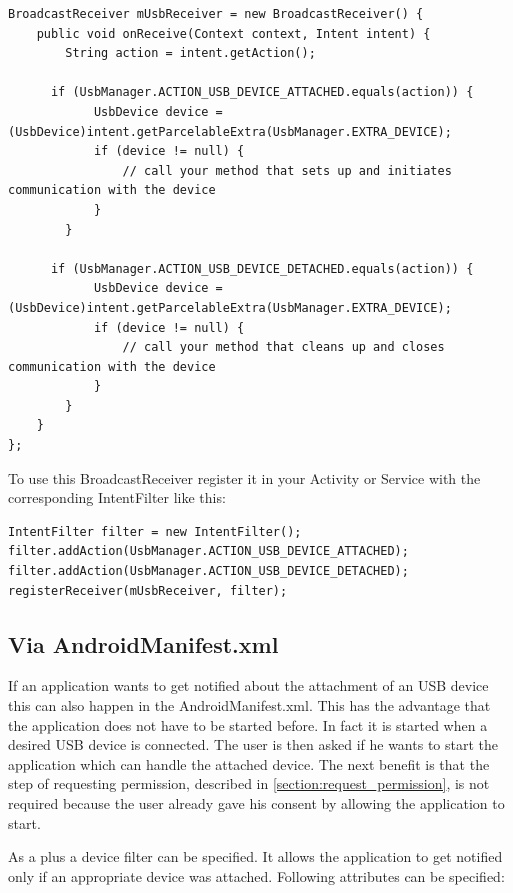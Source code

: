 \begin{lstlisting}[caption=Attach and detach notification of USB devices via BroadcastReceivers, label=listing:attach_broadcast]
BroadcastReceiver mUsbReceiver = new BroadcastReceiver() {
    public void onReceive(Context context, Intent intent) {
        String action = intent.getAction(); 

      if (UsbManager.ACTION_USB_DEVICE_ATTACHED.equals(action)) {
            UsbDevice device = (UsbDevice)intent.getParcelableExtra(UsbManager.EXTRA_DEVICE);
            if (device != null) {
                // call your method that sets up and initiates communication with the device
            }
        }

      if (UsbManager.ACTION_USB_DEVICE_DETACHED.equals(action)) {
            UsbDevice device = (UsbDevice)intent.getParcelableExtra(UsbManager.EXTRA_DEVICE);
            if (device != null) {
                // call your method that cleans up and closes communication with the device
            }
        }
    }
};
\end{lstlisting}

To use this BroadcastReceiver register it in your Activity or Service with the corresponding IntentFilter like this:

\begin{lstlisting}[caption=Register the BroadcastReceiver with the desired actions, label=listing:attach_register]
IntentFilter filter = new IntentFilter();
filter.addAction(UsbManager.ACTION_USB_DEVICE_ATTACHED);
filter.addAction(UsbManager.ACTION_USB_DEVICE_DETACHED);
registerReceiver(mUsbReceiver, filter);
\end{lstlisting}

\subsection{Via AndroidManifest.xml}

If an application wants to get notified about the attachment of an USB device this can also happen in the AndroidManifest.xml. This has the advantage that the application does not have to be started before. In fact it is started when a desired USB device is connected. The user is then asked if he wants to start the application which can handle the attached device. The next benefit is that the step of requesting permission, described in \ref{section:request_permission}, is not required because the user already gave his consent by allowing the application to start.

As a plus a device filter can be specified. It allows the application to get notified only if an appropriate device was attached. Following attributes can be specified\cite{android_usb_host}:

